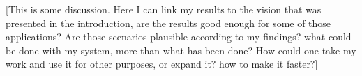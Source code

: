 [This is some discussion.
Here I can link my results to the vision that was presented in the introduction, are the results good enough for some of those applications? Are those scenarios plausible according to my findings? what could be done with my system, more than what has been done? How could one take my work and use it for other purposes, or expand it? how to make it faster?]